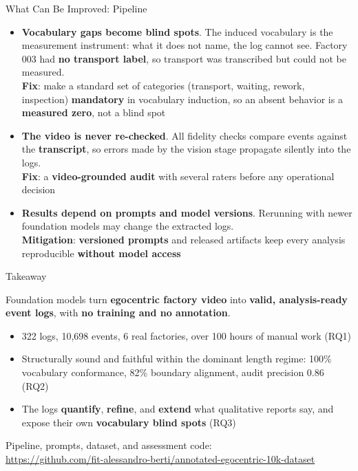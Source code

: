 \documentclass[aspectratio=169]{beamer}
\newcommand{\keyc}[1]{\textbf{\textcolor{egoblue}{#1}}}
\newcommand{\keyg}[1]{\textbf{\textcolor{egogreen!70!black}{#1}}}
\newcommand{\keya}[1]{\textbf{\textcolor{egoamber!85!black}{#1}}}
\begin{document}
\begin{frame}{What Can Be Improved: Pipeline}
  \small
  \begin{itemize}\setlength{\itemsep}{9pt}
    \item \keya{Vocabulary gaps become blind spots}. The induced vocabulary is
      the measurement instrument: what it does not name, the log cannot see.
      Factory 003 had \keya{no transport label}, so transport was transcribed
      but could not be measured.\\
      \keyc{Fix}: make a standard set of categories (transport, waiting,
      rework, inspection) \keyc{mandatory} in vocabulary induction, so an
      absent behavior is a \keyg{measured zero}, not a blind spot
    \item \keya{The video is never re-checked}. All fidelity checks compare
      events against the \keyg{transcript}, so errors made by the vision stage
      propagate silently into the logs.\\
      \keyc{Fix}: a \keyc{video-grounded audit} with several raters before any
      operational decision
    \item \keya{Results depend on prompts and model versions}. Rerunning with
      newer foundation models may change the extracted logs.\\
      \keyc{Mitigation}: \keyc{versioned prompts} and released artifacts keep
      every analysis reproducible \keyg{without model access}
  \end{itemize}
\end{frame}

\begin{frame}{Takeaway}
  \begin{block}{}
    \centering Foundation models turn \keyc{egocentric factory video} into
    \keyg{valid, analysis-ready event logs}, with \keya{no training and no
    annotation}.
  \end{block}
  \vspace{3mm}
  \begin{itemize}\setlength{\itemsep}{7pt}
    \item 322 logs, 10{,}698 events, 6 real factories, over 100 hours of
      manual work (RQ1)
    \item Structurally sound and faithful within the dominant length regime:
      100\% vocabulary conformance, 82\% boundary alignment,
      audit precision 0.86 (RQ2)
    \item The logs \keyg{quantify}, \keyg{refine}, and \keyg{extend} what
      qualitative reports say, and expose their own \keya{vocabulary blind
      spots} (RQ3)
  \end{itemize}
  \vspace{3mm}
  \centering\small Pipeline, prompts, dataset, and assessment code:\\
  \url{https://github.com/fit-alessandro-berti/annotated-egocentric-10k-dataset}
\end{frame}
\end{document}
